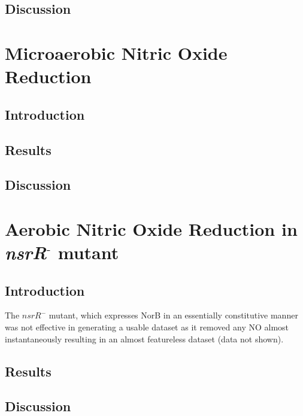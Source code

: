 \subsection{Discussion}
\section{Microaerobic Nitric Oxide Reduction}
\subsection{Introduction}
\subsection{Results}
\subsection{Discussion}
\section{\texorpdfstring{Aerobic Nitric Oxide Reduction in \textit{nsrR$^\textrm{-}$} mutant}{Aerobic Nitric Oxide Reduction in nsrR- mutant}}
\subsection{Introduction}
 The $\mathit{nsrR}^-$ mutant, which expresses NorB in an essentially constitutive manner was not effective in generating a usable dataset as it removed any NO almost instantaneously resulting in an almost featureless dataset (data not shown).
\subsection{Results}
\subsection{Discussion}